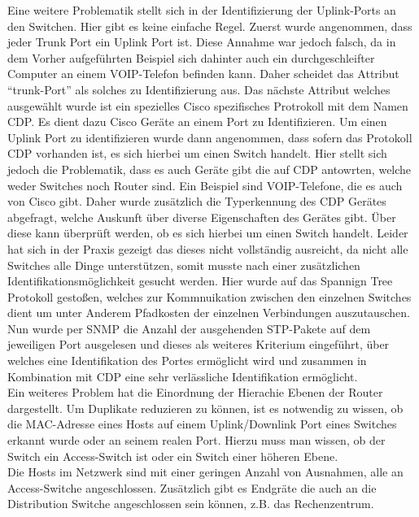 Eine weitere Problematik stellt sich in der Identifizierung der Uplink-Ports an den Switchen. Hier gibt es keine einfache Regel. Zuerst wurde angenommen, dass jeder Trunk Port ein Uplink Port ist. Diese Annahme war jedoch falsch, da in dem Vorher aufgeführten Beispiel sich dahinter auch ein durchgeschleifter Computer an einem VOIP-Telefon befinden kann. Daher scheidet das Attribut “trunk-Port” als solches zu Identifizierung aus. Das nächste Attribut welches ausgewählt wurde ist ein spezielles Cisco spezifisches Protrokoll mit dem Namen CDP. Es dient dazu Cisco Geräte an einem Port zu Identifizieren. Um einen Uplink Port zu identifizieren wurde dann angenommen, dass sofern das Protokoll CDP vorhanden ist, es sich hierbei um einen Switch handelt. Hier stellt sich jedoch die Problematik, dass es auch Geräte gibt die auf CDP antowrten, welche weder Switches noch Router sind. Ein Beispiel sind VOIP-Telefone, die es auch von Cisco gibt. Daher wurde zusätzlich die Typerkennung des CDP Gerätes abgefragt, welche Auskunft über diverse Eigenschaften des Gerätes gibt. Über diese kann überprüft werden, ob es sich hierbei um einen Switch handelt. Leider hat sich in der Praxis gezeigt das dieses nicht vollständig ausreicht, da nicht alle Switches alle Dinge unterstützen, somit musste nach einer zusätzlichen Identifikationsmöglichkeit gesucht werden. Hier wurde auf das Spannign Tree Protokoll gestoßen, welches zur Kommnuikation zwischen den einzelnen Switches dient um unter Anderem Pfadkosten der einzelnen Verbindungen auszutauschen. Nun wurde per SNMP die Anzahl der ausgehenden STP-Pakete auf dem jeweiligen Port ausgelesen und dieses als weiteres Kriterium eingeführt, über welches eine Identifikation des Portes ermöglicht wird und zusammen in Kombination mit CDP eine sehr verlässliche Identifikation ermöglicht.\\
Ein weiteres Problem hat die Einordnung der Hierachie Ebenen der Router dargestellt. Um Duplikate reduzieren zu können, ist es notwendig zu wissen, ob die MAC-Adresse eines Hosts auf einem Uplink/Downlink Port eines Switches erkannt wurde oder an seinem realen Port. Hierzu muss man wissen, ob der Switch ein Access-Switch ist oder ein Switch einer höheren Ebene.\\

Die Hosts im Netzwerk sind mit einer geringen Anzahl von Ausnahmen, alle an Access-Switche angeschlossen. Zusätzlich gibt es Endgräte die auch an die Distribution Switche angeschlossen sein können, z.B. das Rechenzentrum. 

